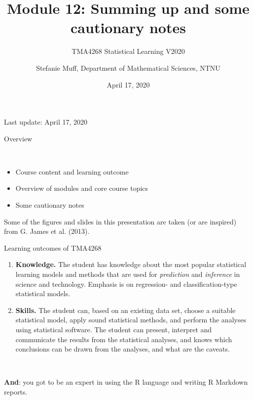 \documentclass[10pt,ignorenonframetext,]{beamer}
\title{Module 12: Summing up and some cautionary notes}
\subtitle{TMA4268 Statistical Learning V2020}
\author{Stefanie Muff, Department of Mathematical Sciences, NTNU}
\date{April 17, 2020}
\begin{document}
\frame{\titlepage}

\begin{frame}

Last update: April 17, 2020

\end{frame}

\begin{frame}{Overview}
\protect\hypertarget{overview}{}

\(~\)

\begin{itemize}
\item
  Course content and learning outcome \vspace{2mm}
\item
  Overview of modules and core course topics \vspace{2mm}
\item
  Some cautionary notes
\end{itemize}

\end{frame}

\begin{frame}

Some of the figures and slides in this presentation are taken (or are
inspired) from G. James et al. (2013).

\end{frame}

\begin{frame}{Learning outcomes of TMA4268}
\protect\hypertarget{learning-outcomes-of-tma4268}{}

\begin{enumerate}
\item
  \textbf{Knowledge.} The student has knowledge about the most popular
  statistical learning models and methods that are used for
  \emph{prediction} and \emph{inference} in science and technology.
  Emphasis is on regression- and classification-type statistical models.
\item
  \textbf{Skills.} The student can, based on an existing data set,
  choose a suitable statistical model, apply sound statistical methods,
  and perform the analyses using statistical software. The student can
  present, interpret and communicate the results from the statistical
  analyses, and knows which conclusions can be drawn from the analyses,
  and what are the caveats.
\end{enumerate}

\(~\)

\textbf{And}: you got to be an expert in using the R language and
writing R Markdown reports.

\end{frame}
\end{document}
